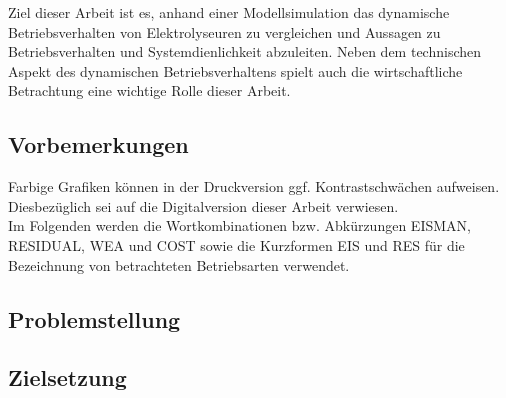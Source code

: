\documentclass[onecolumn,10pt,titlepage]{article}
\begin{document}
Ziel dieser Arbeit ist es, anhand einer Modellsimulation das dynamische Betriebsverhalten von Elektrolyseuren zu vergleichen und  Aussagen zu Betriebsverhalten und Systemdienlichkeit abzuleiten. Neben dem technischen Aspekt des dynamischen Betriebsverhaltens spielt auch die wirtschaftliche Betrachtung eine wichtige Rolle dieser Arbeit.\\

\subsection{Vorbemerkungen}
Farbige Grafiken können in der Druckversion ggf. Kontrastschwächen aufweisen. Diesbezüglich sei auf die Digitalversion dieser Arbeit verwiesen.\\
Im Folgenden werden die Wortkombinationen bzw. Abkürzungen EISMAN, RESIDUAL, WEA und COST sowie die Kurzformen EIS und RES für die Bezeichnung von betrachteten Betriebsarten verwendet.


\subsection{Problemstellung}



\subsection{Zielsetzung}
\end{document}

